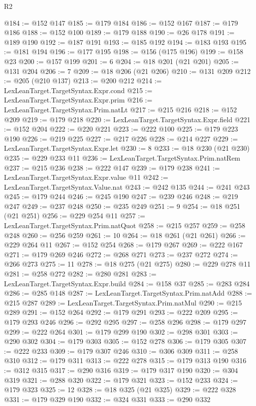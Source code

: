 \begin{lexlean}{R2}
\begin{coremodule}
@184 := @152 @147
@185 := @179 @184
@186 := @152 @167
@187 := @179 @186
@188 := @152 @100
@189 := @179 @188
@190 := @26 @178
@191 := @189 @190
@192 := @187 @191
@193 := @185 @192
@194 := @183 @193
@195 := @181 @194
@196 := @177 @195
@198 := @156 (@175 @196)
@199 := @158 @23
@200 := @157 @199
@201 := 6
@204 := @18 @201 (@21 @201)
@205 := @131 @204
@206 := 7
@209 := @18 @206 (@21 @206)
@210 := @131 @209
@212 := @205 (@210 @137)
@213 := @200 @212
@214 := LexLeanTarget.TargetSyntax.Expr.cond
@215 := LexLeanTarget.TargetSyntax.Expr.prim
@216 := LexLeanTarget.TargetSyntax.Prim.natLt
@217 := @215 @216
@218 := @152 @209
@219 := @179 @218
@220 := LexLeanTarget.TargetSyntax.Expr.field
@221 := @152 @204
@222 := @220 @221
@223 := @222 @100
@225 := @179 @223 @190
@226 := @219 @225
@227 := @217 @226
@228 := @214 @227
@229 := LexLeanTarget.TargetSyntax.Expr.let
@230 := 8
@233 := @18 @230 (@21 @230)
@235 := @229 @233 @11
@236 := LexLeanTarget.TargetSyntax.Prim.natRem
@237 := @215 @236
@238 := @222 @147
@239 := @179 @238
@241 := LexLeanTarget.TargetSyntax.Expr.value @11
@242 := LexLeanTarget.TargetSyntax.Value.nat
@243 := @242 @135
@244 := @241 @243
@245 := @179 @244
@246 := @245 @190
@247 := @239 @246
@248 := @219 @247
@249 := @237 @248
@250 := @235 @249
@251 := 9
@254 := @18 @251 (@21 @251)
@256 := @229 @254 @11
@257 := LexLeanTarget.TargetSyntax.Prim.natQuot
@258 := @215 @257
@259 := @258 @248
@260 := @256 @259
@261 := 10
@264 := @18 @261 (@21 @261)
@266 := @229 @264 @11
@267 := @152 @254
@268 := @179 @267
@269 := @222 @167
@271 := @179 @269 @246
@272 := @268 @271
@273 := @237 @272
@274 := @266 @273
@275 := 11
@278 := @18 @275 (@21 @275)
@280 := @229 @278 @11
@281 := @258 @272
@282 := @280 @281
@283 := LexLeanTarget.TargetSyntax.Expr.build
@284 := @158 @37
@285 := @283 @284
@286 := @285 @148
@287 := LexLeanTarget.TargetSyntax.Prim.natAdd
@288 := @215 @287
@289 := LexLeanTarget.TargetSyntax.Prim.natMul
@290 := @215 @289
@291 := @152 @264
@292 := @179 @291
@293 := @222 @209
@295 := @179 @293 @246
@296 := @292 @295
@297 := @258 @296
@298 := @179 @297
@299 := @222 @264
@301 := @179 @299 @190
@302 := @298 @301
@303 := @290 @302
@304 := @179 @303
@305 := @152 @278
@306 := @179 @305
@307 := @222 @233
@309 := @179 @307 @246
@310 := @306 @309
@311 := @258 @310
@312 := @179 @311
@313 := @222 @278
@315 := @179 @313 @190
@316 := @312 @315
@317 := @290 @316
@319 := @179 @317 @190
@320 := @304 @319
@321 := @288 @320
@322 := @179 @321
@323 := @152 @233
@324 := @179 @323
@325 := 12
@328 := @18 @325 (@21 @325)
@329 := @222 @328
@331 := @179 @329 @190
@332 := @324 @331
@333 := @290 @332

\end{coremodule}
\end{lexlean}
